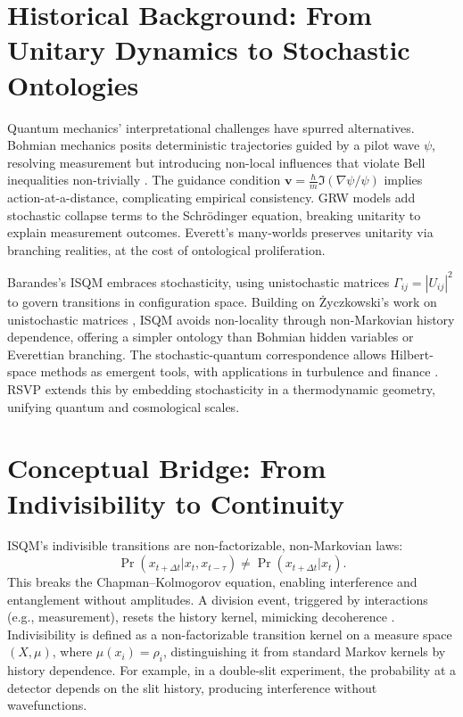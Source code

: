 \documentclass[12pt]{article}
\begin{document}
\section{Historical Background: From Unitary Dynamics to Stochastic Ontologies}

Quantum mechanics’ interpretational challenges have spurred alternatives. Bohmian mechanics \citep{Bohm1952} posits deterministic trajectories guided by a pilot wave \(\psi\), resolving measurement but introducing non-local influences that violate Bell inequalities non-trivially \citep{Bell1987}. The guidance condition \(\mathbf{v} = \frac{\hbar}{m} \Im (\nabla \psi / \psi)\) implies action-at-a-distance, complicating empirical consistency. GRW models \citep{Ghirardi1986} add stochastic collapse terms to the Schrödinger equation, breaking unitarity to explain measurement outcomes. Everett’s many-worlds \citep{Everett1957} preserves unitarity via branching realities, at the cost of ontological proliferation.

Barandes’s ISQM \citep{Barandes2023} embraces stochasticity, using unistochastic matrices \(\Gamma_{ij} = |U_{ij}|^2\) to govern transitions in configuration space. Building on Życzkowski’s work on unistochastic matrices \citep{Zyczkowski1994, Zyczkowski2003}, ISQM avoids non-locality through non-Markovian history dependence, offering a simpler ontology than Bohmian hidden variables or Everettian branching. The stochastic-quantum correspondence allows Hilbert-space methods as emergent tools, with applications in turbulence and finance \citep{Stratonovich1963}. RSVP extends this by embedding stochasticity in a thermodynamic geometry, unifying quantum and cosmological scales.

\section{Conceptual Bridge: From Indivisibility to Continuity}

ISQM’s indivisible transitions are non-factorizable, non-Markovian laws:
\[
\Pr(x_{t + \Delta t} | x_t, x_{t - \tau}) \neq \Pr(x_{t + \Delta t} | x_t).
\]
This breaks the Chapman–Kolmogorov equation, enabling interference and entanglement without amplitudes. A division event, triggered by interactions (e.g., measurement), resets the history kernel, mimicking decoherence \citep{Barandes2023}. Indivisibility is defined as a non-factorizable transition kernel on a measure space \((X, \mu)\), where \(\mu(x_i) = \rho_i\), distinguishing it from standard Markov kernels by history dependence. For example, in a double-slit experiment, the probability at a detector depends on the slit history, producing interference without wavefunctions.
\end{document}
